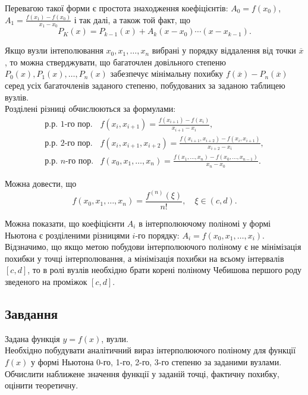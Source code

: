Перевагою такої форми є простота знаходження коефіцієнтів: $A_0 = f(x_0)$, $A_1 = \frac{f(x_1) - f(x_0)}{x_1 - x_0}$ і так далі, а також той факт, що
\begin{equation*}
	P_K(x) = P_{k-1}(x) + A_k(x - x_0) \cdots (x - x_{k - 1}).
\end{equation*}

Якщо вузли інтеполювання $x_0, x_1, \ldots, x_n$ вибрані у порядку віддалення від точки $\overline{x}$, то можна стверджувати, що багаточлен довільного степеню $P_0(x), P_1(x), \ldots, P_n(x)$ забезпечує мінімальну похибку $f(\overline{x}) - P_n(\overline{x})$ серед усіх багаточленів заданого степеню, побудованих за заданою таблицею вузлів.\\

Розділені різниці обчислюються за формулами:
\begin{align}
	\label{eq:2.4}
	\text{р.р. 1-го пор.} & f(x_i, x_{i+1}) = \frac{f(x_{i+1}) - f(x_i)}{x_{i+1}-x_i}, \\
	\text{р.р. 2-го пор.} & f(x_i, x_{i+1}, x_{i+2}) = \frac{f(x_{i+1},x_{i+2}) - f(x_i,x_{i+1})}{x_{i+2}-x_i}, \\
	\text{р.р. }n\text{-го пор.} & f(x_0,x_1, \ldots, x_n) = \frac{f(x_1,\ldots,x_n) - f(x_0,\ldots,x_{n-1})}{x_n-x_0}. 
\end{align}

Можна довести, що 
\begin{equation*}
	f(x_0, x_1, \ldots, x_n) = \frac{f^{(n)}(\xi)}{n!},\quad \xi \in(c,d).
\end{equation*}

Можна показати, що коефіцієнти $A_i$ в інтерполюючому поліномі у формі Ньютона є розділеними різницями $i$-го порядку: $A_i = f(x_0, x_1, \ldots, x_i)$. \\

Відзначимо, що якщо метою побудови інтерполюючого поліному є не мінімізація похибки у точці інтерполювання, а мінімізація похибки на всьому інтервалів $[c, d]$, то в ролі вузлів необхідно брати корені поліному Чебишова першого роду зведеного на проміжок $[c, d]$.

\subsection{Завдання}

Задана функція $y = f(x)$, вузли. \\

Необхідно побудувати аналітичний вираз інтерполюючого поліному для функції $f(x)$ у формі Ньютона 0-го, 1-го, 2-го, 3-го степеню за заданими вузлами. Обчислити наближене значення функції у заданій точці, фактичну похибку, оцінити теоретичну.

